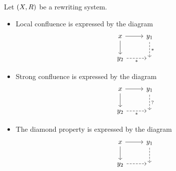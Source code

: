 \begin{example}
Let $\left( X,R \right)$ be a rewriting system.
\begin{itemize}
\item Local confluence is expressed by the diagram
\[ \begin{tikzcd}
x \arrow[r, "{}"] \arrow[d, swap, "{}"] & y_1 \arrow[d, dashed, "{*}"] \\
y_2 \arrow[r, dashed, swap, "{*}"] & {}
\end{tikzcd} \]
\item Strong confluence is expressed by the diagram
\[ \begin{tikzcd}
x \arrow[r] \arrow[d, swap, "{}"] & y_1 \arrow[d, dashed, "{?}"] \\
y_2 \arrow[r, dashed, swap, "{*}"] & {}
\end{tikzcd} \]
\item The diamond property is expressed by the diagram
\[ \begin{tikzcd}
x \arrow[r] \arrow[d, swap, "{}"] & y_1 \arrow[d, dashed, "{}"] \\
y_2 \arrow[r, dashed, swap, "{}"] & {}
\end{tikzcd} \]
\end{itemize}
\end{example}

